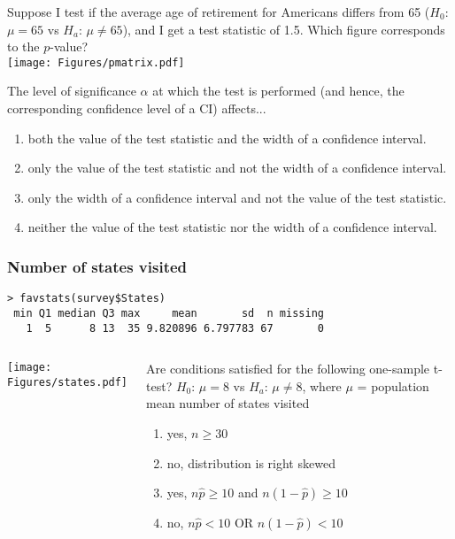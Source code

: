 \begin{frame}
Suppose I test if the average age of retirement for Americans differs from 65 ($H_0$: $\mu=65$ vs $H_a$: $\mu \neq 65$), and I get a test statistic of 1.5.  Which figure corresponds to the $p$-value?\\
\vskip20pt
\texttt{[image: Figures/pmatrix.pdf]}
\end{frame}

\begin{frame}
\begin{clicker}{The level of significance $\alpha$ at which the test is performed (and hence, the corresponding confidence level of a CI) affects...}
\begin{enumerate}
        \item
        both the value of the test statistic and the width of a confidence interval.
        \item
        only the value of the test statistic and not the width of a confidence interval.
        \item
        only the width of a confidence interval and not the value of the test statistic.
        \item
        neither the value of the test statistic nor the width of a confidence interval.
\end{enumerate}
\end{clicker}
\end{frame}



\begin{frame}[fragile]
\frametitle{Number of states visited}
\begin{verbatim}
> favstats(survey$States)
 min Q1 median Q3 max     mean       sd  n missing
   1  5      8 13  35 9.820896 6.797783 67       0
 \end{verbatim}
\begin{columns}
\texttt{[image: Figures/states.pdf]}
\begin{clicker}{Are conditions satisfied for the following one-sample t-test?  $H_0$: $\mu=8$ vs $H_a$: $\mu\neq8$, where $\mu$ = population mean number of states visited}
\begin{enumerate}
    \item
    yes, $n \geq 30$
    \item
    no, distribution is right skewed
    \item
    yes, $n\hat{p} \geq 10$ and $n(1-\hat{p}) \geq 10$
    \item
    no, $n\hat{p} < 10$ OR $n(1-\hat{p}) < 10$
\end{enumerate}
\end{clicker}
\end{columns}
\end{frame}

